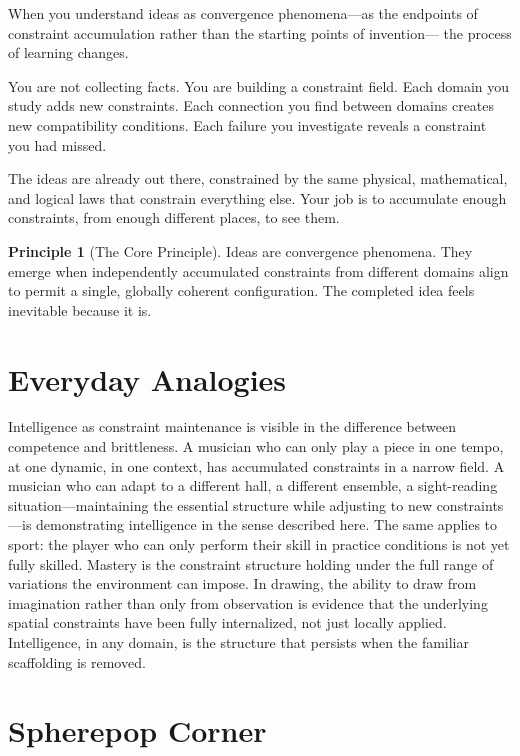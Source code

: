 \documentclass[11pt]{book}
\theoremstyle{definition}
\newtheorem{principle}[definition]{Principle}
\theoremstyle{remark}
\begin{document}
When you understand ideas as convergence phenomena---as the endpoints of
constraint accumulation rather than the starting points of invention---
the process of learning changes.

You are not collecting facts. You are building a constraint field. Each
domain you study adds new constraints. Each connection you find between
domains creates new compatibility conditions. Each failure you investigate
reveals a constraint you had missed.

The ideas are already out there, constrained by the same physical,
mathematical, and logical laws that constrain everything else. Your job
is to accumulate enough constraints, from enough different places, to
see them.

\begin{principle}[The Core Principle]
Ideas are convergence phenomena. They emerge when independently accumulated
constraints from different domains align to permit a single, globally
coherent configuration. The completed idea feels inevitable because it is.
\end{principle}

\section*{Everyday Analogies}

Intelligence as constraint maintenance is visible in the difference
between competence and brittleness. A musician who can only play a
piece in one tempo, at one dynamic, in one context, has accumulated
constraints in a narrow field. A musician who can adapt to a different
hall, a different ensemble, a sight-reading situation---maintaining
the essential structure while adjusting to new constraints---is
demonstrating intelligence in the sense described here. The same
applies to sport: the player who can only perform their skill in
practice conditions is not yet fully skilled. Mastery is the constraint
structure holding under the full range of variations the environment
can impose. In drawing, the ability to draw from imagination rather
than only from observation is evidence that the underlying spatial
constraints have been fully internalized, not just locally applied.
Intelligence, in any domain, is the structure that persists when the
familiar scaffolding is removed.

\section*{Spherepop Corner}
\end{document}
